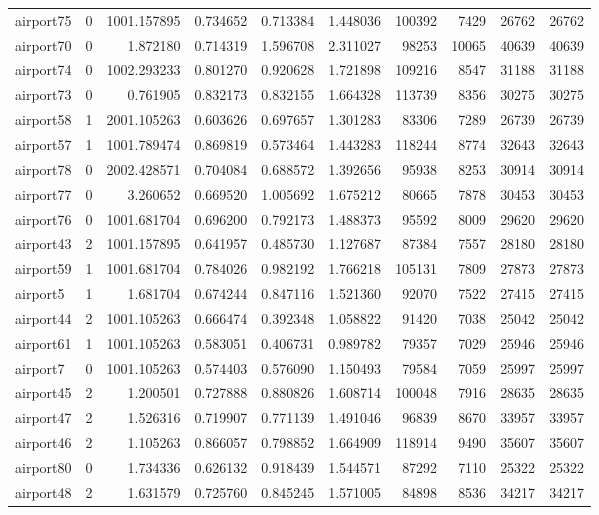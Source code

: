 \begin{longtable}{|l|r|r|r|r|r|r|r|r|r|}
airport75 & 0 & 1001.157895 & 0.734652 & 0.713384 & 1.448036 & 100392 & 7429 & 26762 & 26762 \\
airport70 & 0 & 1.872180 & 0.714319 & 1.596708 & 2.311027 & 98253 & 10065 & 40639 & 40639 \\
airport74 & 0 & 1002.293233 & 0.801270 & 0.920628 & 1.721898 & 109216 & 8547 & 31188 & 31188 \\
airport73 & 0 & 0.761905 & 0.832173 & 0.832155 & 1.664328 & 113739 & 8356 & 30275 & 30275 \\
airport58 & 1 & 2001.105263 & 0.603626 & 0.697657 & 1.301283 & 83306 & 7289 & 26739 & 26739 \\
airport57 & 1 & 1001.789474 & 0.869819 & 0.573464 & 1.443283 & 118244 & 8774 & 32643 & 32643 \\
airport78 & 0 & 2002.428571 & 0.704084 & 0.688572 & 1.392656 & 95938 & 8253 & 30914 & 30914 \\
airport77 & 0 & 3.260652 & 0.669520 & 1.005692 & 1.675212 & 80665 & 7878 & 30453 & 30453 \\
airport76 & 0 & 1001.681704 & 0.696200 & 0.792173 & 1.488373 & 95592 & 8009 & 29620 & 29620 \\
airport43 & 2 & 1001.157895 & 0.641957 & 0.485730 & 1.127687 & 87384 & 7557 & 28180 & 28180 \\
airport59 & 1 & 1001.681704 & 0.784026 & 0.982192 & 1.766218 & 105131 & 7809 & 27873 & 27873 \\
airport5 & 1 & 1.681704 & 0.674244 & 0.847116 & 1.521360 & 92070 & 7522 & 27415 & 27415 \\
airport44 & 2 & 1001.105263 & 0.666474 & 0.392348 & 1.058822 & 91420 & 7038 & 25042 & 25042 \\
airport61 & 1 & 1001.105263 & 0.583051 & 0.406731 & 0.989782 & 79357 & 7029 & 25946 & 25946 \\
airport7 & 0 & 1001.105263 & 0.574403 & 0.576090 & 1.150493 & 79584 & 7059 & 25997 & 25997 \\
airport45 & 2 & 1.200501 & 0.727888 & 0.880826 & 1.608714 & 100048 & 7916 & 28635 & 28635 \\
airport47 & 2 & 1.526316 & 0.719907 & 0.771139 & 1.491046 & 96839 & 8670 & 33957 & 33957 \\
airport46 & 2 & 1.105263 & 0.866057 & 0.798852 & 1.664909 & 118914 & 9490 & 35607 & 35607 \\
airport80 & 0 & 1.734336 & 0.626132 & 0.918439 & 1.544571 & 87292 & 7110 & 25322 & 25322 \\
airport48 & 2 & 1.631579 & 0.725760 & 0.845245 & 1.571005 & 84898 & 8536 & 34217 & 34217 \\

\end{longtable}
